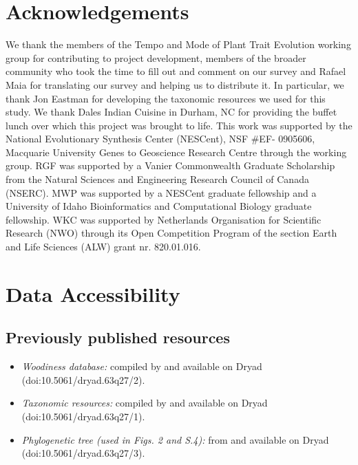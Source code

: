 \documentclass[a4paper,12pt]{article}
\begin{document}
\section{Acknowledgements}

We thank the members of the Tempo and Mode of Plant Trait
Evolution working group for contributing to project development,
members of the broader community who took the time to fill out and
comment on our survey and Rafael Maia for translating our survey and
helping us to distribute it.  In particular, we thank Jon Eastman for 
developing the taxonomic resources we used for this study.
%
We thank Dales Indian Cuisine in Durham, NC for providing the buffet
lunch over which this project was brought to life.
%
This work was supported by the National Evolutionary Synthesis Center
(NESCent), NSF \#EF- 0905606, Macquarie University Genes to Geoscience
Research Centre through the working group.
%
RGF was supported by a Vanier Commonwealth Graduate Scholarship from
the Natural Sciences and Engineering Research Council of Canada
(NSERC).  MWP was supported by a NESCent graduate fellowship and a
University of Idaho Bioinformatics and Computational Biology graduate
fellowship.
%
WKC was supported by Netherlands Organisation for
Scientific Research (NWO) through its Open Competition Program of the
section Earth and Life Sciences (ALW) grant nr. 820.01.016.

\section{Data Accessibility}
\subsection{Previously published resources}
\begin{itemize}
\item \textit{Woodiness database:} compiled by \citet{Zanne} and available on
Dryad (doi:10.5061/dryad.63q27/2).
\item \textit{Taxonomic resources:} compiled by \citet{Zanne} and available on
Dryad (doi:10.5061/dryad.63q27/1).
\item \textit{Phylogenetic tree (used in Figs. 2 and S.4):} from \citet{Zanne} and
available on Dryad (doi:10.5061/dryad.63q27/3).
\end{itemize}
\end{document}
